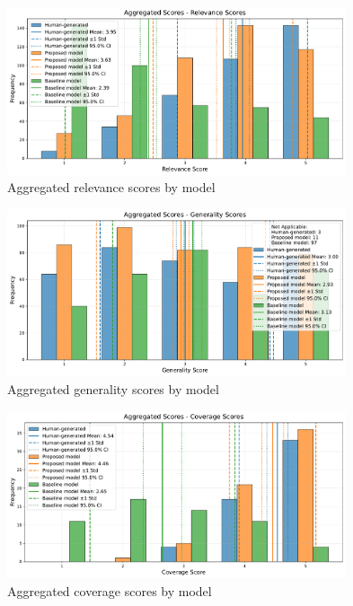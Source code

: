 \begin{figure}[h]
    \centering
    \includegraphics[width=0.89\textwidth]{figures/tags_analysis_relevance_comparison.pdf}
    \caption{Aggregated relevance scores by model}
    \label{fig:tags_analysis_comparison_relevance}
\end{figure}

\begin{figure}[h]
    \centering
    \includegraphics[width=0.89\textwidth]{figures/tags_analysis_generality_comparison.pdf}
    \caption{Aggregated generality scores by model}
    \label{fig:tags_analysis_comparison_generality}
\end{figure}

\begin{figure}[h]
    \centering
    \includegraphics[width=0.89\textwidth]{figures/tags_analysis_coverage_comparison.pdf}
    \caption{Aggregated coverage scores by model}
    \label{fig:tags_analysis_comparison_coverage}
\end{figure}

